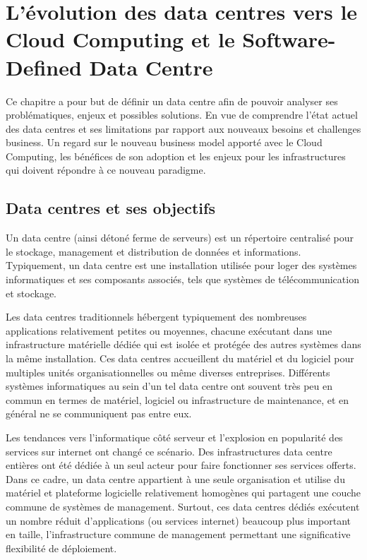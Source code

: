 \chapter{L'évolution des data centres vers le Cloud Computing et le Software-Defined Data Centre}
\label{chap-1}

Ce chapitre a pour but de définir un data centre afin de pouvoir analyser ses problématiques, enjeux et possibles solutions. En vue de comprendre l'état actuel des data centres et ses limitations par rapport aux nouveaux besoins et challenges business. Un regard sur le nouveau business model apporté avec le Cloud Computing, les bénéfices de son adoption et les enjeux pour les infrastructures qui doivent répondre à ce nouveau paradigme.

\section{Data centres et ses objectifs}

Un data centre (ainsi détoné ferme de serveurs) est un répertoire centralisé pour le stockage, management et distribution de données et informations. Typiquement, un data centre est une installation utilisée pour loger des systèmes informatiques et ses composants associés, tels que systèmes de télécommunication et stockage. \cite{understandingCloudWhatDC}

Les data centres traditionnels hébergent typiquement des nombreuses applications relativement petites ou moyennes, chacune exécutant dans une infrastructure matérielle dédiée qui est isolée et protégée des autres systèmes dans la même installation. Ces data centres accueillent du matériel et du logiciel pour multiples unités organisationnelles ou même diverses entreprises. Différents systèmes informatiques au sein d'un tel data centre ont souvent très peu en commun en termes de matériel, logiciel ou infrastructure de maintenance, et en général ne se communiquent pas entre eux. 


Les tendances vers l'informatique côté serveur et l'explosion en popularité des services sur internet ont changé ce scénario. Des infrastructures data centre entières ont été dédiée à un seul acteur pour faire fonctionner ses services offerts. Dans ce cadre, un data centre appartient à une seule organisation et utilise du matériel et plateforme logicielle relativement homogènes qui partagent une couche commune de systèmes de management. Surtout, ces data centres dédiés exécutent un nombre réduit d'applications (ou services internet) beaucoup plus important en taille, l'infrastructure commune de management permettant une significative flexibilité de déploiement. 

